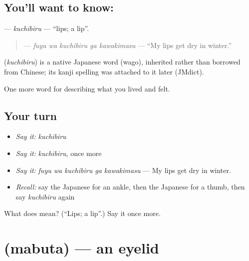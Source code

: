 \subsection*{You'll want to know: }
\textbf{} — \emph{kuchibiru} — \textquotedblleft{}lips; a lip\textquotedblright{}.

\begin{quote}
\textbf{  } — \emph{fuyu wa kuchibiru ga kawakimasu} — \textquotedblleft{}My lips get dry in winter.\textquotedblright{}
\end{quote}

\begin{cousinweb}
\textbf{} (\emph{kuchibiru}) is a native Japanese word (wago), inherited rather than borrowed from Chinese; its kanji spelling was attached to it later (JMdict).
\end{cousinweb}

\begin{grammarlens}[title={What you've built}]
One more word for describing what you lived and felt.
\end{grammarlens}

\subsection*{Your turn}
\begin{itemize}
\raggedright
  \item \emph{Say it:} \emph{kuchibiru}
  \item \emph{Say it:} \emph{kuchibiru}, once more
  \item \emph{Say it:} \emph{fuyu wa kuchibiru ga kawakimasu} — My lips get dry in winter.
  \item \emph{Recall:} say the Japanese for an ankle, then the Japanese for a thumb, then say \emph{kuchibiru} again
\end{itemize}

\begin{tcolorbox}[breakable,colback=teal!4,colframe=teal!35!black,title={Before you move on}]
What does  mean? (\textquotedblleft{}Lips; a lip\textquotedblright{}.) Say it once more.
\end{tcolorbox}
\section[\texorpdfstring{\ja{まぶた} (mabuta)}{まぶた (mabuta)}]{ (mabuta) — an eyelid}

